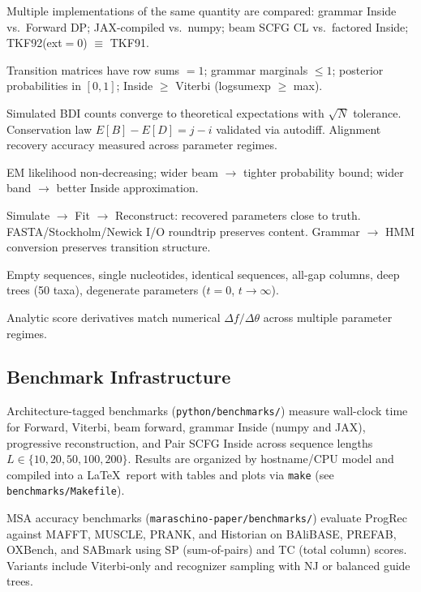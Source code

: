 \begin{description}[style=nextline,leftmargin=2em]
\item[Cross-validation]
  Multiple implementations of the same quantity are compared:
  grammar Inside vs.\ Forward DP; JAX-compiled vs.\ numpy;
  beam SCFG CL vs.\ factored Inside; TKF92(ext$=$0) $\equiv$ TKF91.

\item[Probability invariants]
  Transition matrices have row sums $= 1$; grammar marginals $\leq 1$;
  posterior probabilities in $[0, 1]$; Inside $\geq$ Viterbi (logsumexp $\geq$ max).

\item[Statistical consistency]
  Simulated BDI counts converge to theoretical expectations
  with $\sqrt{N}$ tolerance.
  Conservation law $E[B] - E[D] = j - i$ validated via autodiff.
  Alignment recovery accuracy measured across parameter regimes.

\item[Monotonicity]
  EM likelihood non-decreasing; wider beam $\to$ tighter probability bound;
  wider band $\to$ better Inside approximation.

\item[Roundtrip integrity]
  Simulate $\to$ Fit $\to$ Reconstruct: recovered parameters close to truth.
  FASTA/Stockholm/Newick I/O roundtrip preserves content.
  Grammar $\to$ HMM conversion preserves transition structure.

\item[Edge cases]
  Empty sequences, single nucleotides, identical sequences, all-gap columns,
  deep trees (50 taxa), degenerate parameters ($t = 0$, $t \to \infty$).

\item[Finite-difference validation]
  Analytic score derivatives match numerical $\Delta f / \Delta\theta$
  across multiple parameter regimes.
\end{description}

\subsection{Benchmark Infrastructure}
\label{sec:impl-benchmarks}

Architecture-tagged benchmarks (\texttt{python/benchmarks/}) measure
wall-clock time for Forward, Viterbi, beam forward, grammar Inside
(numpy and JAX), progressive reconstruction, and Pair SCFG Inside
across sequence lengths $L \in \{10, 20, 50, 100, 200\}$.
Results are organized by hostname/CPU model and compiled into
a \LaTeX\ report with tables and plots via \texttt{make} (see
\texttt{benchmarks/Makefile}).

MSA accuracy benchmarks (\texttt{maraschino-paper/benchmarks/}) evaluate
ProgRec against MAFFT, MUSCLE, PRANK, and Historian on BAliBASE,
PREFAB, OXBench, and SABmark using SP (sum-of-pairs) and TC (total column)
scores. Variants include Viterbi-only and recognizer sampling with
NJ or balanced guide trees.
